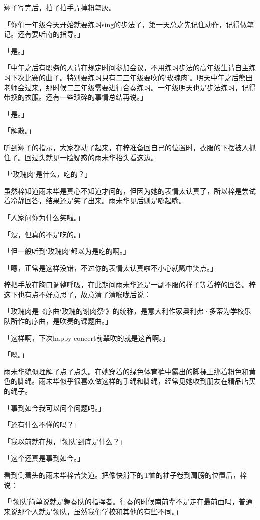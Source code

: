 \documentclass[UTF8]{ctexart}
\begin{document}
    翔子写完后，拍了拍手弄掉粉笔灰。

    「你们一年级今天开始就要练习sing的步法了，第一天总之先记住动作，记得做笔记。还有要听南的指导。」

    「是。」

    「中午之后有职务的人请在规定时间参加会议，不用练习步法的高年级生请自主练习下次比赛的曲子。特别要练习只有二三年级要吹的‘玫瑰肉’。明天中午之后熊田老师会过来，那时候二三年级需要进行合奏练习。一年级明天也是步法练习，记得带换的衣服。还有一些琐碎的事情总结再说。」

    「是。」

    「解散。」

    听到翔子的指示，大家都动了起来，在梓准备回自己的位置时，衣服的下摆被人抓住了。回过头就见一脸疑惑的雨未华抬头看这边。

    「‘玫瑰肉’是什么，吃的？」

    虽然梓知道雨未华是真心不知道才问的，但因为她的表情太认真了，所以梓是尝试着冷静回答，结果还是笑了出来。雨未华见后则是嘟起嘴。

    「人家问你为什么笑啦。」

    「没，但真的不是吃的。」

    「但一般听到‘玫瑰肉’都以为是吃的啊。」

    「嗯，正常是这样没错，不过你的表情太认真啦不小心就戳中笑点。」

    梓把手放在胸口调整呼吸，在此期间雨未华还是一副不服的样子等着梓的回答。梓这下也有点不好意思了，故意清了清喉咙后说：

    「玫瑰肉是《序曲‘玫瑰的谢肉祭’》的统称，是意大利作家奥利弗·多蒂为学校乐队所作的序曲，是吹奏的课题曲。」

    「这样啊，下次happy concert前辈吹的就是这首啊。」

    「嗯。」

    雨未华貌似理解了点了点头。在她穿着的绿色体育裤中露出的脚裸上绑着粉色和黄色的脚绳。雨未华似乎很喜欢做这样的手绳和脚绳，经常见她收到朋友在精品店买的绳子。

    「事到如今我可以问个问题吗。」

    「还有什么不懂的吗？」

    「我以前就在想，‘领队’到底是什么？」

    「这个还真是事到如今。」

    看到侧着头的雨未华梓苦笑道。把像快滑下的T恤的袖子卷到肩膀的位置后，梓说：

    「‘领队’简单说就是舞奏队的指挥者。行奏的时候南前辈不是走在最前面吗，普通来说那个人就是领队，虽然我们学校和其他的有些不同。」
\end{document}
